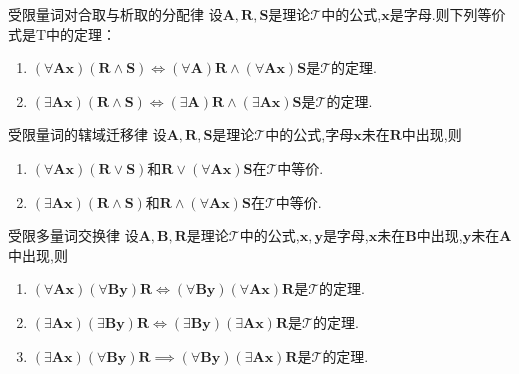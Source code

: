 \begin{metatheorem}{受限量词对合取与析取的分配律}{}
	设$\boldsymbol{A},\boldsymbol{R},\boldsymbol{S}$是理论$\mathcal{T}$中的公式,$\boldsymbol{x}$是字母.则下列等价式是T中的定理：
	\begin{enumerate}
		\item $\left(\forall\boldsymbol{A}\boldsymbol{x}\right)\left(\boldsymbol{R}\wedge\boldsymbol{S}\right)\iff\left(\forall\boldsymbol{A}\right)\boldsymbol{R}\wedge\left(\forall\boldsymbol{A}\boldsymbol{x}\right)\boldsymbol{S}$是$\mathcal{T}$的定理.
		\item $\left(\exists\boldsymbol{A}\boldsymbol{x}\right)\left(\boldsymbol{R}\wedge\boldsymbol{S}\right)\iff\left(\exists\boldsymbol{A}\right)\boldsymbol{R}\wedge\left(\exists\boldsymbol{A}\boldsymbol{x}\right)\boldsymbol{S}$是$\mathcal{T}$的定理.
	\end{enumerate}
\end{metatheorem}

\begin{metatheorem}{受限量词的辖域迁移律}{}
	设$\boldsymbol{A},\boldsymbol{R},\boldsymbol{S}$是理论$\mathcal{T}$中的公式,字母$\boldsymbol{x}$未在$\boldsymbol{R}$中出现,则
	\begin{enumerate}
		\item $\left(\forall\boldsymbol{A}\boldsymbol{x}\right)\left(\boldsymbol{R}\vee\boldsymbol{S}\right)$和$\boldsymbol{R}\vee\left(\forall\boldsymbol{A}\boldsymbol{x}\right)\boldsymbol{S}$在$\mathcal{T}$中等价.
		\item $\left(\exists\boldsymbol{A}\boldsymbol{x}\right)\left(\boldsymbol{R}\wedge\boldsymbol{S}\right)$和$\boldsymbol{R}\wedge\left(\forall\boldsymbol{A}\boldsymbol{x}\right)\boldsymbol{S}$在$\mathcal{T}$中等价.
	\end{enumerate}
\end{metatheorem}

\begin{metatheorem}{受限多量词交换律}{}
	设$\boldsymbol{A},\boldsymbol{B},\boldsymbol{R}$是理论$\mathcal{T}$中的公式,$\boldsymbol{x},\boldsymbol{y}$是字母,$\boldsymbol{x}$未在$\boldsymbol{B}$中出现,$\boldsymbol{y}$未在$\boldsymbol{A}$中出现,则
	\begin{enumerate}
		\item $\left(\forall\boldsymbol{A}\boldsymbol{x}\right)\left(\forall\boldsymbol{B}\boldsymbol{y}\right)\boldsymbol{R}\iff\left(\forall\boldsymbol{B}\boldsymbol{y}\right)\left(\forall\boldsymbol{A}\boldsymbol{x}\right)\boldsymbol{R}$是$\mathcal{T}$的定理.
		\item $\left(\exists\boldsymbol{A}\boldsymbol{x}\right)\left(\exists\boldsymbol{B}\boldsymbol{y}\right)\boldsymbol{R}\iff\left(\exists\boldsymbol{B}\boldsymbol{y}\right)\left(\exists\boldsymbol{A}\boldsymbol{x}\right)\boldsymbol{R}$是$\mathcal{T}$的定理.
		\item $\left(\exists\boldsymbol{A}\boldsymbol{x}\right)\left(\forall\boldsymbol{B}\boldsymbol{y}\right)\boldsymbol{R}\implies\left(\forall\boldsymbol{B}\boldsymbol{y}\right)\left(\exists\boldsymbol{A}\boldsymbol{x}\right)\boldsymbol{R}$是$\mathcal{T}$的定理.
	\end{enumerate}
\end{metatheorem}
